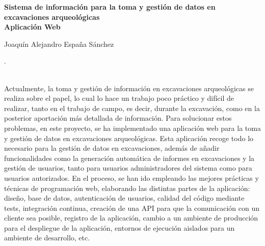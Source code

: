\thispagestyle{empty}
\cleardoublepage

\begin{center}
{\large\bfseries Sistema de información para la toma y gestión de datos en excavaciones arqueológicas \\ Aplicación Web }\\
\end{center}
\begin{center}
	Joaquín Alejandro España Sánchez\\
\end{center}


\vspace{0.5cm}
. \\
							     
\vspace{0.7cm}

 \\

Actualmente, la toma y gestión de información en excavaciones arqueológicas se realiza sobre el papel, lo cual lo hace un trabajo poco práctico y difícil de realizar, tanto en el trabajo
de campo, es decir, durante la excavación, como en la posterior aportación más detallada de información. Para solucionar estos problemas, en este proyecto, se ha implementado una aplicación
web para la toma y gestión de datos en excavaciones arqueológicas. Esta aplicación recoge todo lo necesario para la gestión de datos en excavaciones, además de añadir funcionalidades
como la generación automática de informes en excavaciones y la gestión de usuarios, tanto para usuarios administradores del sistema como para usuarios autorizados. En el proceso, se han
ido empleando las mejores prácticas y técnicas de programación web, elaborando las distintas partes de la aplicación: diseño, base de datos, autenticación de usuarios, calidad del código
mediante tests, integración continua, creación de una API para que la comunicación con un cliente sea posible, registro de la aplicación, cambio a un ambiente de producción para el despliegue
de la aplicación, entornos de ejecución aislados para un ambiente de desarrollo, etc.

